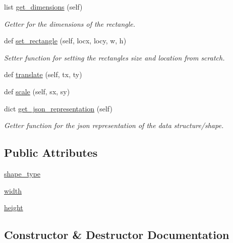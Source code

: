 \begin{DoxyCompactItemize}
$$list \mbox{\hyperlink{classbridges_1_1rectangle_1_1_rectangle_a7d7cd4157280043a0e25bb80ed0f9ca5}{get\+\_\+dimensions}} (self)
\begin{DoxyCompactList}\small\item\em Getter for the dimensions of the rectangle. \end{DoxyCompactList}\item 
def \mbox{\hyperlink{classbridges_1_1rectangle_1_1_rectangle_a187376dcdc5c10c5b1ce5f3f00a80961}{set\+\_\+rectangle}} (self, locx, locy, w, h)
\begin{DoxyCompactList}\small\item\em Setter function for setting the rectangles size and location from scratch. \end{DoxyCompactList}\item 
def \mbox{\hyperlink{classbridges_1_1rectangle_1_1_rectangle_aa032816d119516e90a4237cd979a5d41}{translate}} (self, tx, ty)
\item 
def \mbox{\hyperlink{classbridges_1_1rectangle_1_1_rectangle_af540e714f768efb6142310047fffc8c7}{scale}} (self, sx, sy)
\item 
dict \mbox{\hyperlink{classbridges_1_1rectangle_1_1_rectangle_a5ead80ed6cd7d287e3884e8792b51b40}{get\+\_\+json\+\_\+representation}} (self)
\begin{DoxyCompactList}\small\item\em Getter function for the json representation of the data structure/shape. \end{DoxyCompactList}\end{DoxyCompactItemize}
\subsection*{Public Attributes}
\begin{DoxyCompactItemize}
\item 
\mbox{\hyperlink{classbridges_1_1rectangle_1_1_rectangle_acd8a51dab1da86bd859fb47fb7ab1884}{shape\+\_\+type}}
\item 
\mbox{\hyperlink{classbridges_1_1rectangle_1_1_rectangle_ac70360e861fb0dfab5fae8525ffc86ba}{width}}
\item 
\mbox{\hyperlink{classbridges_1_1rectangle_1_1_rectangle_a3b7a2448881d5eea95e86aac8dfae467}{height}}
\end{DoxyCompactItemize}


\subsection{Constructor \& Destructor Documentation}
\mbox{\label{classbridges_1_1rectangle_1_1_rectangle_aa332e06ef9abf830af50eda608598811}} 
